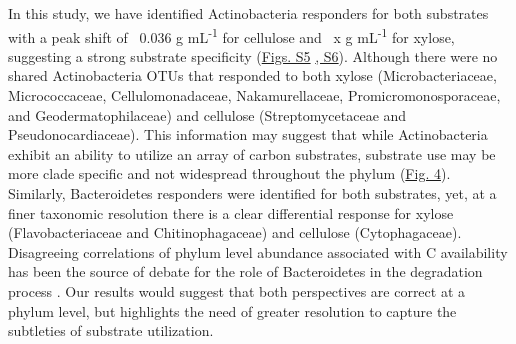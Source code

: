 In this study, we have identified Actinobacteria responders for both substrates with a peak shift of ~0.036 g mL\textsuperscript{-1} for cellulose and ~x g mL\textsuperscript{-1} for xylose, suggesting a strong substrate specificity (\href{https://authorea.com/users/3537/articles/8459/master/file/figures/xylose_resp_profiles/xylose_resp_profiles.png}{Figs. S5} \href{https://authorea.com/users/3537/articles/8459/master/file/figures/cellulose_resp_profiles/cellulose_resp_profiles.png}{, S6}). Although there were no shared Actinobacteria OTUs that responded to both xylose (Microbacteriaceae, Micrococcaceae, Cellulomonadaceae, Nakamurellaceae, Promicromonosporaceae, and Geodermatophilaceae) and cellulose (Streptomycetaceae and Pseudonocardiaceae). This information may suggest that while Actinobacteria exhibit an ability to utilize an array of carbon substrates, substrate use may be more clade specific and not widespread throughout the phylum (\href{https://authorea.com/users/3537/articles/3612/master/file/figures/bacteria_tree/bacteria_tree.png}{Fig. 4}). Similarly, Bacteroidetes responders were identified for both substrates, yet, at a finer taxonomic resolution there is a clear differential response for xylose (Flavobacteriaceae and Chitinophagaceae) and cellulose (Cytophagaceae). Disagreeing correlations of phylum level abundance associated with C availability has been the source of debate for the role of Bacteroidetes in the degradation process \cite{Fierer_2007,Rui_2009,Sharp_2000,L_pez_Lozano_2013,Bastian_2009}. Our results would suggest that both perspectives are correct at a phylum level, but highlights the need of greater resolution to capture the subtleties of substrate utilization.   

